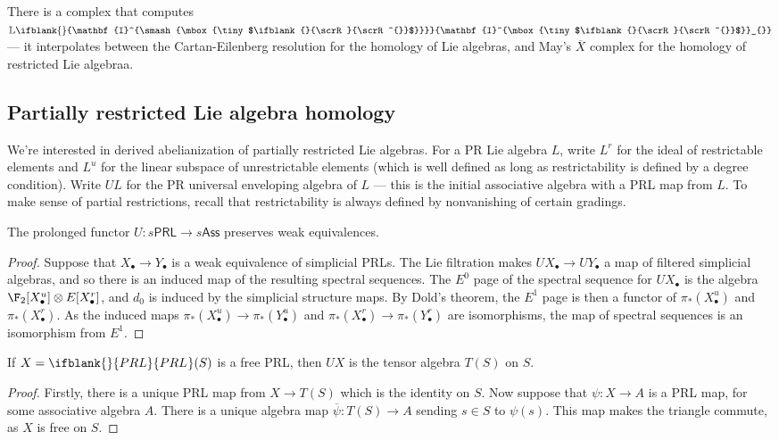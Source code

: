 \documentclass[10pt]{article}
\newcommand{\PRLie}[1]%
{\ifblank{#1}{\scrR}{\scrR^{#1}}}
\newcommand{\Ind}[2][]{\ifblank{#1}{\mathbf{I}^{\smash{\mbox{\tiny $#2$}}}}{\mathbf{I}^{\mbox{\tiny $#2$}}_{#1}}}%
\newcommand{\Fr}[2][]{\ifblank{#1}{#2}{#2_{#1}}}
\newcommand{\derived}{\mathbb{L}}
\begin{document}
\begin{DerivedFunctorsLowDimension}
There is a complex that computes $\derived\Ind{\PRLie{}}$ --- it interpolates between the Cartan-Eilenberg resolution for the homology of Lie algebras, and May's $\overline{X}$ complex for the homology of restricted Lie algebraa.
\end{DerivedFunctorsLowDimension}

\begin{PRlieKoszulComplexCalculationOriginalWithSSeq}
\subsection{Partially restricted Lie algebra homology}
We're interested in derived abelianization of partially restricted Lie algebras. For a PR Lie algebra $L$, write $L^r$ for the ideal of restrictable elements and $L^u$ for the linear subspace of unrestrictable elements (which is well defined as long as restrictability is defined by a degree condition). Write $UL$ for the PR universal enveloping algebra of $L$ --- this is the initial associative algebra with a PRL map from $L$. To make sense of partial restrictions, recall that restrictability is always defined by nonvanishing of certain gradings.

\begin{lem}
The prolonged functor $U:s\mathsf{PRL}\to s\mathsf{Ass}$ preserves weak equivalences.
\end{lem}
\begin{proof}
Suppose that $X_\bullet\to Y_\bullet$ is a weak equivalence of simplicial PRLs. The Lie filtration makes $UX_\bullet\to UY_\bullet$ a map of filtered simplicial algebras, and so there is an induced map of the resulting spectral sequences. The $E^0$ page of the spectral sequence for $UX_\bullet$ is the algebra $\F_2[X_\bullet^u]\otimes E[X_\bullet^r]$, and $d_0$ is induced by the simplicial structure maps. By Dold's theorem, the $E^1$ page is then a functor of $\pi_*(X_\bullet^u)$ and $\pi_*(X_\bullet^r)$. As the induced maps $\pi_*(X_\bullet^u)\to\pi_*(Y_\bullet^u)$ and $\pi_*(X_\bullet^r)\to\pi_*(Y_\bullet^r)$ are isomorphisms, the map of spectral sequences is an isomorphism from $E^1$.
\end{proof}

\begin{lem}
If $X=\Fr{PRL}(S)$ is a free PRL, then $UX$ is the tensor algebra $T(S)$ on $S$.
\end{lem}
\begin{proof}
Firstly, there is a unique PRL map from $X\to T(S)$ which is the identity on $S$. Now suppose that $\psi:X\to A$ is a PRL map, for some associative algebra $A$. There is a unique algebra map $\overline{\psi}:T(S)\to A$ sending $s\in S$ to $\psi(s)$. This map makes the triangle commute, as $X$ is free on $S$.
\end{proof}


\end{PRlieKoszulComplexCalculationOriginalWithSSeq}
\end{document}
